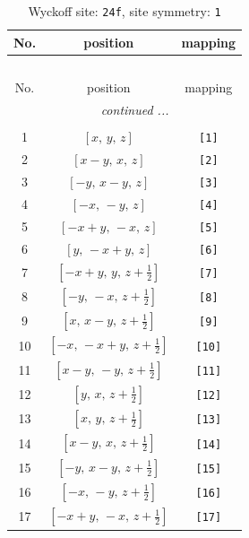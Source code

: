 \documentclass[fleqn,8pt]{jsarticle}
\begin{document}
\begin{longtable}{ccc}
\caption{Wyckoff site: {\tt 24f}, site symmetry: {\tt 1}}
 \\
 \hline \hline
No. & position & mapping \\ \hline \endfirsthead

\multicolumn{2}{l}{\tablename\ \thetable{}} \\
 \hline \hline
No. & position & mapping \\ \hline \endhead

 \hline \hline
\multicolumn{2}{r}{\footnotesize\it continued ...} \\ \endfoot

 \hline \hline
\multicolumn{2}{r}{} \\ \endlastfoot

1 & $\left[ x,\, y,\, z \right]$ & {\tt [1]} \\ \hline
2 & $\left[ x - y,\, x,\, z \right]$ & {\tt [2]} \\ \hline
3 & $\left[ - y,\, x - y,\, z \right]$ & {\tt [3]} \\ \hline
4 & $\left[ - x,\, - y,\, z \right]$ & {\tt [4]} \\ \hline
5 & $\left[ - x + y,\, - x,\, z \right]$ & {\tt [5]} \\ \hline
6 & $\left[ y,\, - x + y,\, z \right]$ & {\tt [6]} \\ \hline
7 & $\left[ - x + y,\, y,\, z + \frac{1}{2} \right]$ & {\tt [7]} \\ \hline
8 & $\left[ - y,\, - x,\, z + \frac{1}{2} \right]$ & {\tt [8]} \\ \hline
9 & $\left[ x,\, x - y,\, z + \frac{1}{2} \right]$ & {\tt [9]} \\ \hline
10 & $\left[ - x,\, - x + y,\, z + \frac{1}{2} \right]$ & {\tt [10]} \\ \hline
11 & $\left[ x - y,\, - y,\, z + \frac{1}{2} \right]$ & {\tt [11]} \\ \hline
12 & $\left[ y,\, x,\, z + \frac{1}{2} \right]$ & {\tt [12]} \\ \hline
13 & $\left[ x,\, y,\, z + \frac{1}{2} \right]$ & {\tt [13]} \\ \hline
14 & $\left[ x - y,\, x,\, z + \frac{1}{2} \right]$ & {\tt [14]} \\ \hline
15 & $\left[ - y,\, x - y,\, z + \frac{1}{2} \right]$ & {\tt [15]} \\ \hline
16 & $\left[ - x,\, - y,\, z + \frac{1}{2} \right]$ & {\tt [16]} \\ \hline
17 & $\left[ - x + y,\, - x,\, z + \frac{1}{2} \right]$ & {\tt [17]} \\ \hline

\end{longtable}
\end{document}
